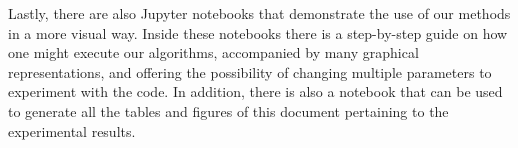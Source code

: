 Lastly, there are also Jupyter notebooks that demonstrate the use of our methods in a more visual way. Inside these notebooks there is a step-by-step guide on how one might execute our algorithms, accompanied by many graphical representations, and offering the possibility of changing multiple parameters to experiment with the code. In addition, there is also a notebook that can be used to generate all the tables and figures of this document pertaining to the experimental results.
